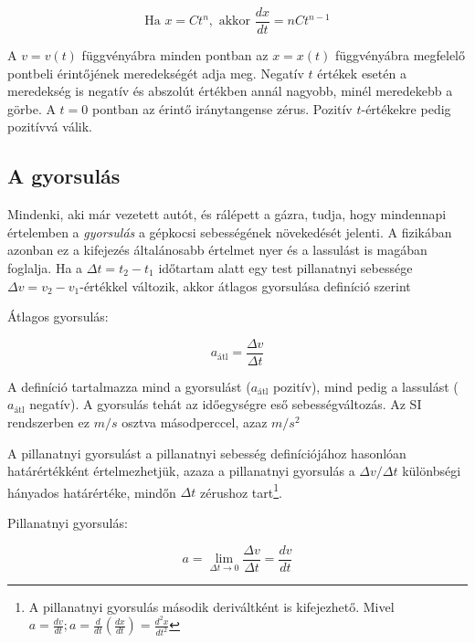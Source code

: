 \documentclass[../fizika.tex]{subfiles}
\begin{document}
                \begin{equation}
                    \text{Ha } x = Ct^n, \text{ akkor } \frac{dx}{dt} = nCt^{n-1}
                \end{equation}

                A $v = v(t)$ függvényábra minden pontban az $x = x(t)$ függvényábra megfelelő pontbeli érintőjének meredekségét adja meg. Negatív $t$ értékek esetén a meredekség is negatív és abszolút értékben annál nagyobb, minél meredekebb a görbe. A $t = 0$ pontban az érintő iránytangense zérus. Pozitív $t$-értékekre pedig pozitívvá válik.

            \subsection{A gyorsulás}

                \noindent Mindenki, aki már vezetett autót, és rálépett a gázra, tudja, hogy mindennapi értelemben a \textit{gyorsulás} a gépkocsi sebességének növekedését jelenti. A fizikában azonban ez a kifejezés általánosabb értelmet nyer és a lassulást is magában foglalja. Ha a $\Delta t = t_2 - t_1$ időtartam alatt egy test pillanatnyi sebessége $\Delta v = v_2 - v_1$-értékkel változik, akkor átlagos gyorsulása definíció szerint

                Átlagos gyorsulás:

                \begin{equation} 
                    a_{\text{átl}} = \frac{\Delta v}{\Delta t}
                \end{equation}

                \noindent A definíció tartalmazza mind a gyorsulást ($a_{\text{átl}}$ pozitív), mind pedig a lassulást ($a_{\text{átl}}$ negatív). A gyorsulás tehát az időegységre eső sebességváltozás. Az SI rendszerben ez $m/s$ osztva másodperccel, azaz $m/s^2$

                A pillanatnyi gyorsulást a pillanatnyi sebesség definíciójához hasonlóan határértékként értelmezhetjük, azaza a pillanatnyi gyorsulás a $\Delta v / \Delta t$ különbségi hányados határértéke, mindőn $\Delta t$ zérushoz tart\footnote[1]{A pillanatnyi gyorsulás második deriváltként is kifejezhető. Mivel $a = \frac{dv}{dt}; a = \frac{d}{dt}(\frac{dx}{dt}) = \frac{d^2x}{dt^2}$}.

                Pillanatnyi gyorsulás:

                \begin{equation} \tag{1-6} \label{eq:1-6}
                    a = \lim_{\Delta t \rightarrow 0} \frac{\Delta v}{\Delta t} = \frac{dv}{dt} 
                \end{equation}
\end{document}
